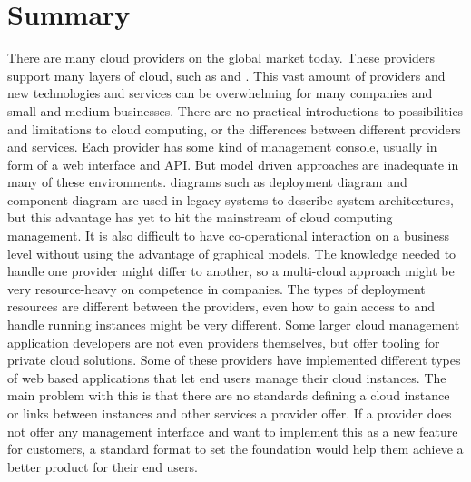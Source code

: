 \section{Summary}

There are many cloud providers on the global market today. 
These providers support many layers of cloud, such as  and .
This vast amount of providers and new technologies and services can be overwhelming 
for many companies and small and medium businesses. 
There are no practical introductions to possibilities and limitations to cloud computing, 
or the differences between different providers and services. 
Each provider has some kind of management console, usually in form of a web interface and API. 
But model driven approaches are inadequate in many of these environments. 
 diagrams such as deployment diagram and component diagram are used in legacy systems 
to describe system architectures, 
but this advantage has yet to hit the mainstream of cloud computing management. 
It is also difficult to have co-operational interaction on a business level without 
using the advantage of graphical models.
The knowledge needed to handle one provider might differ to another, 
so a multi-cloud approach might be very resource-heavy on competence in companies. 
The types of deployment resources are different between the providers, 
even how to gain access to and handle running instances might be very different. 
Some larger cloud management application developers are not even providers themselves, 
but offer tooling for private cloud solutions.
Some of these providers have implemented different types of web based applications 
that let end users manage their cloud instances. 
The main problem with this is that there are no standards defining a 
cloud instance or links between instances and other services a provider offer.
If a provider does not offer any management interface and want to implement this as a new feature for customers, 
a standard format to set the foundation would help them achieve a better product for their end users.
